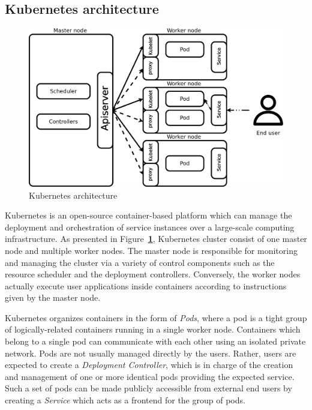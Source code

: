\documentclass[letterpaper,twocolumn,10pt]{article}
\let\origref\ref
\def\ref#1{\textbf{\origref{#1}}}
\begin{document}
\subsection{Kubernetes architecture}

\begin{figure}[t]
  \centering
  \includegraphics[width=\linewidth]{images/arch.png}
  \caption{Kubernetes architecture} 
  \label{fig:arch}
\end{figure}

Kubernetes is an open-source container-based platform which can manage
the deployment and orchestration of service instances over a
large-scale computing infrastructure. As presented in
Figure~\ref{fig:arch}, Kubernetes cluster consist of one master node
and multiple worker nodes. The master node is responsible for
monitoring and managing the cluster via a variety of control
components such as the resource scheduler and the deployment
controllers. Conversely, the worker nodes actually execute user
applications inside containers according to instructions given by the
master node.

Kubernetes organizes containers in the form of \emph{Pods}, where a
pod is a tight group of logically-related containers running in a
single worker node. Containers which belong to a single pod can
communicate with each other using an isolated private network. Pods
are not usually managed directly by the users. Rather, users are
expected to create a \emph{Deployment Controller}, which is in charge
of the creation and management of one or more identical pods providing
the expected service. Such a set of pods can be made publicly
accessible from external end users by creating a \emph{Service} which
acts as a frontend for the group of pods.
\end{document}
